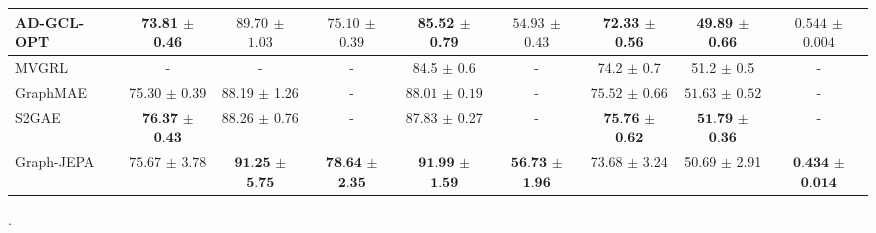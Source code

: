 \documentclass{article} \usepackage{iclr2024_conference,times}
\begin{document}
\begin{table}
{\begin{tabular}{|lccc|cccc||c|}
        AD-GCL-OPT \citep{suresh2021adversarial} & 73.81 $\pm$ 0.46 & $\textit{89.70}$ $\pm$ $\textit{1.03}$ & $\textit{75.10}$ $\pm$ $\textit{0.39}$ & 85.52 $\pm$ 0.79 & $\textit{54.93}$ $\pm$ $\textit{0.43}$ & 72.33 $\pm$ 0.56 & 49.89 $\pm$ 0.66 & $\textit{0.544}$ $\pm$ $\textit{0.004}$ \\ \hline
        MVGRL \citep{hassani2020contrastive} & - & - & - &  84.5 $\pm$ 0.6 & - & 74.2 $\pm$ 0.7 & 51.2 $\pm$ 0.5 & - \\ \hline \hline
        GraphMAE \citep{hou2022graphmae} & 75.30 $\pm$ 0.39 & 88.19 $\pm$ 1.26  & - & $\textit{88.01}$ $\pm$ $\textit{0.19}$ & - & $\textit{75.52}$ $\pm$ $\textit{0.66}$ & $\textit{51.63}$ $\pm$ $\textit{0.52}$ & - \\ \hline
        S2GAE \citep{tan2023s2gae} & $\textbf{76.37}$ $\pm$ $\textbf{0.43}$ & 88.26 $\pm$ 0.76 & - & 87.83 $\pm$ 0.27 & - & $\textbf{75.76}$ $\pm$ $\textbf{0.62}$ & $\textbf{51.79}$ $\pm$ $\textbf{0.36}$ & - \\ \hline \hline         
        Graph-JEPA & $\textit{75.67}$ $\pm$ $\textit{3.78}$ & $\textbf{91.25}$ $\pm$ $\textbf{5.75}$ & $\textbf{78.64}$ $\pm$ $\textbf{2.35}$ & $\textbf{91.99}$ $\pm$ $\textbf{1.59}$ & $\textbf{56.73}$ $\pm$ $\textbf{1.96}$ & 73.68 $\pm$ 3.24 & 50.69 $\pm$ 2.91 & $\textbf{0.434}$ $\pm$ $\textbf{0.014}$ \\ \hline
    \end{tabular}}
    \label{tab:main-res}  
\end{table}

\begin{table}
    \centering
    \caption{Classification accuracy on the synthetic EXP dataset \citep{abboud2020surprising}, which contains 600 pairs of non-isomorphic graphs that are indistinguishable by the 1-WL test. The competitor models are proposed in \citep{kipf2016semi,bresson2017residual,xu2018powerful,dwivedi2020generalization,he2023generalization}}.  
    \label{tab:wl-res}
\end{table}
\end{document}
